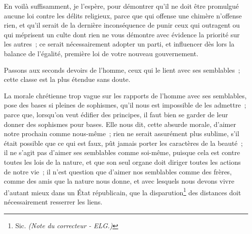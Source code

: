 \documentclass[french,twoside]{book} %
\begin{document}
En voilà suffisamment, je l’espère, pour démontrer qu’il ne doit être promulgué aucune loi contre les délits religieux, parce que qui offense une chimère n’offense rien, et qu’il serait de la dernière inconséquence de punir ceux qui outragent ou qui méprisent un culte dont rien ne vous démontre avec évidence la priorité sur les autres ; ce serait nécessairement adopter un parti, et influencer dès lors la balance de l’égalité, première loi de votre nouveau gouvernement.\par
Passons aux seconds devoirs de l’homme, ceux qui le lient avec ses semblables ; cette classe est la plus étendue sans doute.\par
La morale chrétienne trop vague sur les rapports de l’homme avec ses semblables, pose des bases si pleines de sophismes, qu’il nous est impossible de les admettre ; parce que, lorsqu’on veut édifier des principes, il faut bien se garder de leur donner des sophismes pour bases. Elle nous dit, cette absurde morale, d’aimer notre prochain comme nous-même ; rien ne serait assurément plus sublime, s’il était possible que ce qui est faux, pût jamais porter les caractères de la beauté ; il ne s’agit pas d’aimer ses semblables comme soi-même, puisque cela est contre toutes les lois de la nature, et que son seul organe doit diriger toutes les actions de notre vie ; il n’est question que d’aimer nos semblables comme des frères, comme des amis que la nature nous donne, et avec lesquels nous devons vivre d’autant mieux dans un État républicain, que la disparution\footnote{ Sic. {\itshape (Note du correcteur - ELG.)}} des distances doit nécessairement resserrer les liens.\par
\end{document}

